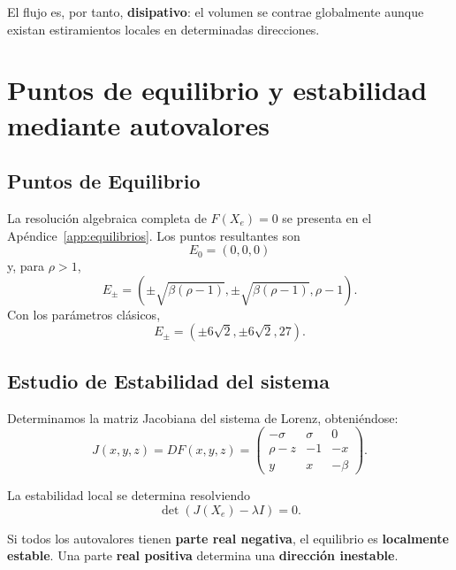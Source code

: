 \documentclass[12pt,a4paper,oneside]{report}
\theoremstyle{definition}
\numberwithin{equation}{chapter}
\begin{document}
El flujo es, por tanto, \textbf{disipativo}: el volumen se contrae globalmente aunque existan estiramientos locales en determinadas direcciones.

\chapter{Puntos de equilibrio y estabilidad mediante autovalores}

\section{Puntos de Equilibrio}
La resolución algebraica completa de \(F(X_e)=0\) se presenta en el Apéndice~\ref{app:equilibrios}. Los puntos resultantes son
\begin{equation}
    E_0=(0,0,0)
\end{equation}
y, para \(\rho>1\),
\begin{equation}
    E_{\pm}= \left( \pm\sqrt{\beta(\rho-1)}, \pm\sqrt{\beta(\rho-1)}, \rho-1 \right).
\end{equation}
Con los parámetros clásicos,
\begin{equation}
    \boxed{ E_{\pm}=(\pm6\sqrt2,\pm6\sqrt2,27). }
\end{equation}

\section{Estudio de Estabilidad del sistema}
Determinamos la matriz Jacobiana del sistema de Lorenz, obteniéndose: 
\begin{equation}
    \boxed{
    J(x,y,z)=DF(x,y,z)=
    \begin{pmatrix}
        -\sigma & \sigma & 0\\
        \rho-z & -1 & -x\\
        y & x & -\beta
    \end{pmatrix}.}
    \label{eq:jacobiana}
\end{equation}

La estabilidad local se determina resolviendo
\begin{equation}
    \boxed{\det\!\left(J(X_e)-\lambda I\right)=0.}
    \label{eq:problema-espectral}
\end{equation}

Si todos los autovalores tienen \textbf{parte real negativa}, el equilibrio es \textbf{localmente estable}. Una parte \textbf{real positiva} determina una \textbf{dirección inestable}.
\end{document}
